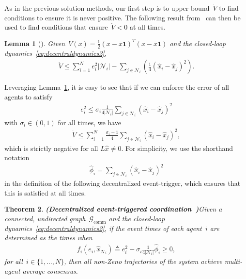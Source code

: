 \documentclass{autart}
\newtheorem{theorem}{Theorem}[section]
\newtheorem{lemma}[theorem]{Lemma}
\newcommand{\GG}{{\mathcal{G}}}
\newcommand{\NN}{{\mathcal{N}}}
\newcommand{\until}[1]{\{1,\dots, #1\}}
\newcommand{\commgraph}{\GG_\text{comm}}
\renewcommand{\hat}{\widehat}
\newcommand{\longthmtitle}[1]{\mbox{}\textup{\textbf{(#1)}}}
\begin{document}
As in the previous solution methods, our first step is to
upper-bound~$\dot{V}$ to find conditions to ensure it is never
positive. The following result from~\citep{CN-JC:16-auto} can then be
used to find conditions that ensure~$\dot{V} < 0$ at all times.

\begin{lemma}[\citep{CN-JC:16-auto}]\label{le:bound}
  Given~$V(x) =
  \frac{1}{2}(x-\bar{x}\mathbf{1})^T(x-\bar{x}\mathbf{1})$
  and the closed-loop dynamics~\eqref{eq:decentraldynamics2},
  \begin{align*}
    \dot{V} \leq \sum_{i=1}^N e_i^2 |\NN_i| - \sum_{j \in \NN_i}
    \left( \frac{1}{4}(\hat{x}_i-\hat{x}_j)^2 \right).  
  \end{align*} 
\end{lemma}

Leveraging Lemma~\ref{le:bound}, it is easy to see that if we can
enforce the error of all agents to satisfy
\begin{align}\label{eq:enforcethisalways}
  e_i^2 \leq \sigma_i \frac{1}{4 | \NN_i |} \sum_{j \in \NN_i}
  (\hat{x}_i - \hat{x}_j)^2
\end{align}
with $\sigma_i \in (0,1)$ for all times, we have
\begin{align}\label{eq:thenthis}
  \dot{V} \leq \sum_{i=1}^N \frac{\sigma_i - 1}{4} \sum_{j \in \NN_i}
  (\hat{x}_i - \hat{x}_j)^2,
\end{align}
which is strictly negative for all $L\hat{x} \neq 0$. For simplicity,
we use the shorthand notation
\begin{align*}
  \hat{\phi}_i = \sum_{j \in \NN_i} (\hat{x}_i - \hat{x}_j)^2 
\end{align*}
in the definition of the following decentralized event-trigger, which
ensures that this is satisfied at all times.

\begin{theorem}\longthmtitle{Decentralized event-triggered
    coordination~\citep{CN-JC:16-auto}}\label{th:broadcast2}
  Given {a connected, undirected graph~$\commgraph$ and} the
  closed-loop dynamics~\eqref{eq:decentraldynamics2}, if the event
  times of each agent~$i$ are determined as the times when
  \begin{align}
    f_i(e_i,\hat{x}_{\NN_i}) \triangleq e_i^2 -
    \sigma_i \frac{1}{4 |\NN_i|} \hat{\phi}_i \geq 0,
  \end{align}
  for all~$i \in \until{N}$, then all non-Zeno trajectories of the
  system achieve multi-agent average consensus.
\end{theorem}
\end{document}
